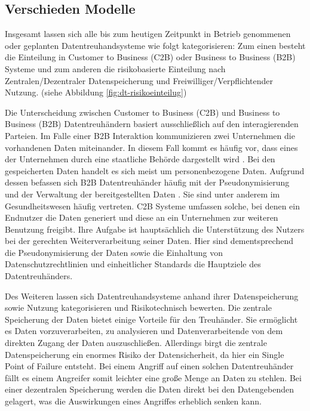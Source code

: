 \documentclass{scrreprt}
\begin{document}
\subsection{Verschieden Modelle}
Insgesamt lassen sich alle bis zum heutigen Zeitpunkt in Betrieb genommenen oder geplanten Datentreuhandsysteme wie folgt kategorisieren: Zum einen besteht die Einteilung in Customer to Business (C2B) oder Business to Business (B2B) Systeme und zum anderen die risikobasierte Einteilung nach Zentralen/Dezentraler Datenspeicherung und Freiwilliger/Verpflichtender Nutzung. (siehe Abbildung \ref{fig:dt-risikoeinteilug})

Die Unterscheidung zwischen Customer to Business (C2B) und Business to Business (B2B) Datentreuhändern basiert ausschließlich auf den interagierenden Parteien. Im Falle einer B2B Interaktion kommunizieren zwei Unternehmen die vorhandenen Daten miteinander. In diesem Fall kommt es häufig vor, dass eines der Unternehmen durch eine staatliche Behörde dargestellt wird . Bei den gespeicherten Daten handelt es sich meist um personenbezogene Daten. Aufgrund dessen befassen sich B2B Datentreuhänder häufig mit der Pseudonymisierung und der Verwaltung der bereitgestellten Daten . Sie sind unter anderem im Gesundheitswesen häufig vertreten. \cite{dt-blankertz2020datentreuhandmodelle}
C2B Systeme umfassen solche, bei denen ein Endnutzer die Daten generiert und diese an ein Unternehmen zur weiteren Benutzung freigibt. Ihre Aufgabe ist hauptsächlich die Unterstützung des Nutzers bei der gerechten Weiterverarbeitung seiner Daten. \cite{dt-blankertz2020datentreuhandmodelle} Hier sind dementsprechend die Pseudonymisierung der Daten sowie die Einhaltung von Datenschutzrechtlinien und einheitlicher Standards die Hauptziele des Datentreuhänders.

Des Weiteren lassen sich Datentreuhandsysteme anhand ihrer Datenspeicherung sowie Nutzung kategorisieren und Risikotechnisch bewerten. Die zentrale Speicherung der Daten bietet einige Vorteile für den Treuhänder. Sie ermöglicht es Daten vorzuverarbeiten, zu analysieren und Datenverarbeitende von dem direkten Zugang der Daten auszuschließen. Allerdings birgt die zentrale Datenspeicherung ein enormes Risiko der Datensicherheit, da hier ein Single Point of Failure entsteht. Bei einem Angriff auf einen solchen Datentreuhänder fällt es einem Angreifer somit leichter eine große Menge an Daten zu stehlen. Bei einer dezentralen Speicherung werden die Daten direkt bei den Datengebenden gelagert, was die Auswirkungen eines Angriffes erheblich senken kann. 
\\
\end{document}
